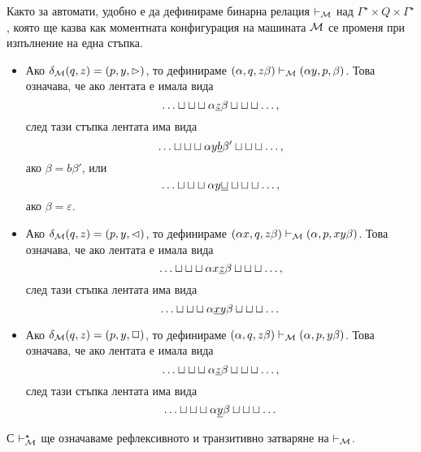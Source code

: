 Както за автомати, удобно е да дефинираме бинарна релация $\vdash_{\mathcal{M}}$ над $\Gamma^\star \times Q \times \Gamma^\star$,
която ще казва как моментната конфигурация на машината $\mathcal{M}$ се променя при изпълнение на една стъпка.
\begin{itemize}
\item
  Ако $\delta_{\mathcal{M}}(q,z) = (p,y,\rhd)$, то дефинираме $(\alpha, q, z\beta) \vdash_{\mathcal{M}} (\alpha y, p, \beta)$.
  Това означава, че ако лентата е имала вида 
  \[\tape{\alpha\underline{z}\beta},\]
  след тази стъпка лентата има вида 
  \[\tape{\alpha y\underline{b}\beta'},\]
  ако $\beta = b\beta'$, или 
  \[\tape{\alpha y\underline{\blank}},\]
  ако $\beta = \varepsilon$.
\item 
  Ако $\delta_{\mathcal{M}}(q,z) = (p,y,\lhd)$, то дефинираме $(\alpha x, q, z\beta) \vdash_{\mathcal{M}} (\alpha , p, xy\beta)$.
  Това означава, че ако лентата е имала вида 
  \[\tape{\alpha x\underline{z}\beta},\]
  след тази стъпка лентата има вида 
  \[\tape{\alpha \underline{x}y\beta}\]
\item
  Ако $\delta_{\mathcal{M}}(q, z) = (p, y, \Box)$, то дефинираме $(\alpha, q, z\beta) \vdash_{\mathcal{M}} (\alpha , p, y\beta)$.
  Това означава, че ако лентата е имала вида 
  \[\tape{\alpha \underline{z}\beta},\]
  след тази стъпка лентата има вида 
  \[\tape{\alpha \underline{y}\beta}\]
  
\end{itemize}
С $\vdash^\star_{\mathcal{M}}$ ще означаваме рефлексивното и транзитивно затваряне на $\vdash_{\mathcal{M}}$.

